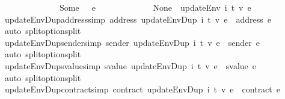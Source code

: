 \begin{isabellebody}
\ \ \ \ \ \ \ \ \ \ \ \ \ \ Some\ {\isacharunderscore}{\kern0pt}\ {\isasymRightarrow}\ e\isanewline
\ \ \ \ \ \ \ \ \ \ \ \ {\isacharbar}{\kern0pt}\ None\ {\isasymRightarrow}\ updateEnv\ i\ t\ v\ e{\isacharparenright}{\kern0pt}{\isachardoublequoteclose}\isanewline
\isanewline
{}\isamarkupfalse%
\ updateEnvDup{\isacharunderscore}{\kern0pt}address{\isacharbrackleft}{\kern0pt}simp{\isacharbrackright}{\kern0pt}{\isacharcolon}{\kern0pt}\ {\isachardoublequoteopen}address\ {\isacharparenleft}{\kern0pt}updateEnvDup\ i\ t\ v\ e{\isacharparenright}{\kern0pt}\ {\isacharequal}{\kern0pt}\ address\ e{\isachardoublequoteclose}\isanewline
%
\isadelimproof
\ \ %
\endisadelimproof
%
\isatagproof
{}\isamarkupfalse%
\ {\isacharparenleft}{\kern0pt}auto\ split{\isacharcolon}{\kern0pt}option{\isachardot}{\kern0pt}split{\isacharparenright}{\kern0pt}%
\endisatagproof
{\isafoldproof}%
%
\isadelimproof
\isanewline
%
\endisadelimproof
\isanewline
{}\isamarkupfalse%
\ updateEnvDup{\isacharunderscore}{\kern0pt}sender{\isacharbrackleft}{\kern0pt}simp{\isacharbrackright}{\kern0pt}{\isacharcolon}{\kern0pt}\ {\isachardoublequoteopen}sender\ {\isacharparenleft}{\kern0pt}updateEnvDup\ i\ t\ v\ e{\isacharparenright}{\kern0pt}\ {\isacharequal}{\kern0pt}\ sender\ e{\isachardoublequoteclose}\isanewline
%
\isadelimproof
\ \ %
\endisadelimproof
%
\isatagproof
{}\isamarkupfalse%
\ {\isacharparenleft}{\kern0pt}auto\ split{\isacharcolon}{\kern0pt}option{\isachardot}{\kern0pt}split{\isacharparenright}{\kern0pt}%
\endisatagproof
{\isafoldproof}%
%
\isadelimproof
\isanewline
%
\endisadelimproof
\isanewline
{}\isamarkupfalse%
\ updateEnvDup{\isacharunderscore}{\kern0pt}svalue{\isacharbrackleft}{\kern0pt}simp{\isacharbrackright}{\kern0pt}{\isacharcolon}{\kern0pt}\ {\isachardoublequoteopen}svalue\ {\isacharparenleft}{\kern0pt}updateEnvDup\ i\ t\ v\ e{\isacharparenright}{\kern0pt}\ {\isacharequal}{\kern0pt}\ svalue\ e{\isachardoublequoteclose}\isanewline
%
\isadelimproof
\ \ %
\endisadelimproof
%
\isatagproof
{}\isamarkupfalse%
\ {\isacharparenleft}{\kern0pt}auto\ split{\isacharcolon}{\kern0pt}option{\isachardot}{\kern0pt}split{\isacharparenright}{\kern0pt}%
\endisatagproof
{\isafoldproof}%
%
\isadelimproof
\isanewline
%
\endisadelimproof
\isanewline
{}\isamarkupfalse%
\ updateEnvDup{\isacharunderscore}{\kern0pt}contract{\isacharbrackleft}{\kern0pt}simp{\isacharbrackright}{\kern0pt}{\isacharcolon}{\kern0pt}\ {\isachardoublequoteopen}contract\ {\isacharparenleft}{\kern0pt}updateEnvDup\ i\ t\ v\ e{\isacharparenright}{\kern0pt}\ {\isacharequal}{\kern0pt}\ contract\ e{\isachardoublequoteclose}\isanewline

\end{isabellebody}
